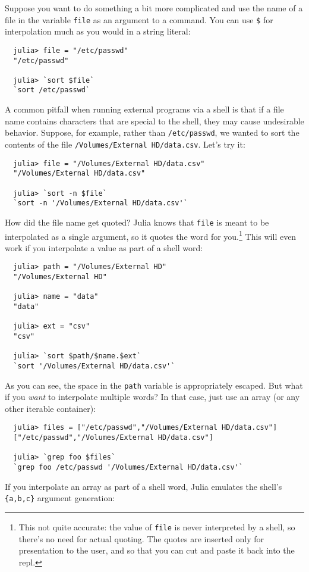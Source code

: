 \documentclass{article}
\begin{document}
Suppose you want to do something a bit more complicated and use the name of a file in the variable \verb|file| as an argument to a command.
You can use \verb|$| for interpolation much as you would in a string literal:
\begin{verbatim}
  julia> file = "/etc/passwd"
  "/etc/passwd"

  julia> `sort $file`
  `sort /etc/passwd`
\end{verbatim}
A common pitfall when running external programs via a shell is that if a file name contains characters that are special to the shell, they may cause undesirable behavior.
Suppose, for example, rather than \verb|/etc/passwd|, we wanted to sort the contents of the file \verb|/Volumes/External HD/data.csv|.
Let's try it:
\begin{verbatim}
  julia> file = "/Volumes/External HD/data.csv"
  "/Volumes/External HD/data.csv"

  julia> `sort -n $file`
  `sort -n '/Volumes/External HD/data.csv'`
\end{verbatim}
How did the file name get quoted?
Julia knows that \verb|file| is meant to be interpolated as a single argument, so it quotes the word for you.\footnote{This not quite accurate:
the value of \texttt{file} is never interpreted by a shell, so there's no need for actual quoting.
The quotes are inserted only for presentation to the user, and so that you can cut and paste it back into the repl.}
This will even work if you interpolate a value as part of a shell word:
\begin{verbatim}
  julia> path = "/Volumes/External HD"
  "/Volumes/External HD"

  julia> name = "data"
  "data"

  julia> ext = "csv"
  "csv"

  julia> `sort $path/$name.$ext`
  `sort '/Volumes/External HD/data.csv'`
\end{verbatim}
As you can see, the space in the \verb|path| variable is appropriately escaped.
But what if you \emph{want} to interpolate multiple words?
In that case, just use an array (or any other iterable container):
\begin{verbatim}
  julia> files = ["/etc/passwd","/Volumes/External HD/data.csv"]
  ["/etc/passwd","/Volumes/External HD/data.csv"]

  julia> `grep foo $files`
  `grep foo /etc/passwd '/Volumes/External HD/data.csv'`
\end{verbatim}
If you interpolate an array as part of a shell word, Julia emulates the shell's \verb|{a,b,c}| argument generation:
\end{document}
